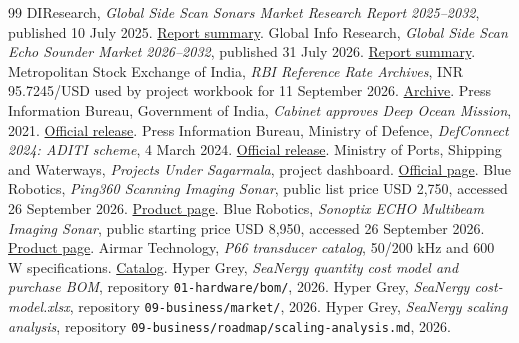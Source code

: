 \documentclass[11pt,a4paper]{article}
\begin{document}
\begin{thebibliography}{99}\small
{} DIResearch, \emph{Global Side Scan Sonars Market Research Report 2025--2032}, published 10 July 2025. \href{https://www.marketresearch.com/Deep-Insights-Research-Co-DIR-v4285/Global-Side-Scan-Sonars-Research-41780036/}{Report summary}.
 Global Info Research, \emph{Global Side Scan Echo Sounder Market 2026--2032}, published 31 July 2026. \href{https://www.marketresearch.com/GlobalInfoResearch-v4117/Global-Side-Scan-Echo-Sounder-45818082/}{Report summary}.
 Metropolitan Stock Exchange of India, \emph{RBI Reference Rate Archives}, INR 95.7245/USD used by project workbook for 11 September 2026. \href{https://www.msei.in/markets/currency/historical-data/rbireferenceratearchives}{Archive}.
 Press Information Bureau, Government of India, \emph{Cabinet approves Deep Ocean Mission}, 2021. \href{https://www.pib.gov.in/PressReleasePage.aspx?PRID=1727526&lang=2&reg=48}{Official release}.
 Press Information Bureau, Ministry of Defence, \emph{DefConnect 2024: ADITI scheme}, 4 March 2024. \href{https://www.pib.gov.in/Pressreleaseshare.aspx?PRID=2011171&lang=2&reg=48}{Official release}.
 Ministry of Ports, Shipping and Waterways, \emph{Projects Under Sagarmala}, project dashboard. \href{https://sagarmala.gov.in/projects/projects-under-sagarmala}{Official page}.
 Blue Robotics, \emph{Ping360 Scanning Imaging Sonar}, public list price USD 2,750, accessed 26 September 2026. \href{https://bluerobotics.com/store/sonars/imaging-sonars/ping360-sonar-r1-rp/}{Product page}.
 Blue Robotics, \emph{Sonoptix ECHO Multibeam Imaging Sonar}, public starting price USD 8,950, accessed 26 September 2026. \href{https://bluerobotics.com/store/sonars/imaging-sonars/sonoptix-echo/}{Product page}.
 Airmar Technology, \emph{P66 transducer catalog}, 50/200 kHz and 600 W specifications. \href{https://www.airmartechnology.com/uploads/catalogPages/cat_55.pdf}{Catalog}.
 Hyper Grey, \emph{SeaNergy quantity cost model and purchase BOM}, repository \texttt{01-hardware/bom/}, 2026.
 Hyper Grey, \emph{SeaNergy cost-model.xlsx}, repository \texttt{09-business/market/}, 2026.
 Hyper Grey, \emph{SeaNergy scaling analysis}, repository \texttt{09-business/roadmap/scaling-analysis.md}, 2026.
\end{thebibliography}
\end{document}
